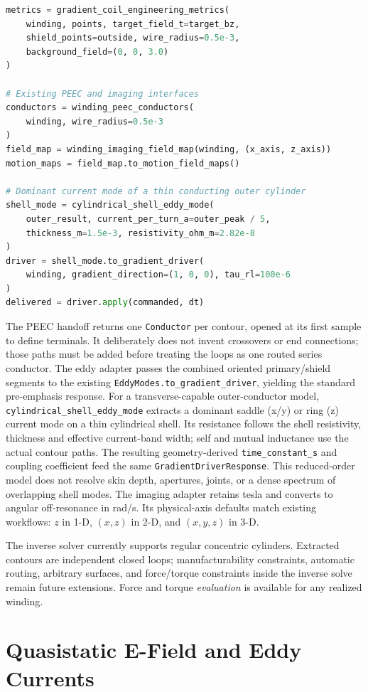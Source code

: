 \documentclass[11pt,oneside]{report}
\newcommand{\code}[1]{\texttt{#1}}
\begin{document}
\begin{lstlisting}[language=Python]
metrics = gradient_coil_engineering_metrics(
    winding, points, target_field_t=target_bz,
    shield_points=outside, wire_radius=0.5e-3,
    background_field=(0, 0, 3.0)
)

# Existing PEEC and imaging interfaces
conductors = winding_peec_conductors(
    winding, wire_radius=0.5e-3
)
field_map = winding_imaging_field_map(winding, (x_axis, z_axis))
motion_maps = field_map.to_motion_field_maps()

# Dominant current mode of a thin conducting outer cylinder
shell_mode = cylindrical_shell_eddy_mode(
    outer_result, current_per_turn_a=outer_peak / 5,
    thickness_m=1.5e-3, resistivity_ohm_m=2.82e-8
)
driver = shell_mode.to_gradient_driver(
    winding, gradient_direction=(1, 0, 0), tau_rl=100e-6
)
delivered = driver.apply(commanded, dt)
\end{lstlisting}

The PEEC handoff returns one \code{Conductor} per contour, opened at its first
sample to define terminals. It deliberately does not invent crossovers or end
connections; those paths must be added before treating the loops as one routed
series conductor. The eddy adapter passes the combined oriented primary/shield
segments to the existing \code{EddyModes.to\_gradient\_driver}, yielding the
standard pre-emphasis response. For a transverse-capable outer-conductor model,
\code{cylindrical\_shell\_eddy\_mode} extracts a dominant saddle (x/y) or ring
(z) current mode on a thin cylindrical shell. Its resistance follows the shell
resistivity, thickness and effective current-band width; self and mutual
inductance use the actual contour paths. The resulting geometry-derived
\code{time\_constant\_s} and coupling coefficient feed the same
\code{GradientDriverResponse}. This reduced-order model does not resolve skin
depth, apertures, joints, or a dense spectrum of overlapping shell modes.
The imaging adapter retains tesla and converts
to angular off-resonance in rad/s. Its physical-axis defaults match existing
workflows: $z$ in 1-D, $(x,z)$ in 2-D, and $(x,y,z)$ in 3-D.

The inverse solver currently supports regular concentric cylinders. Extracted
contours are independent closed loops; manufacturability constraints, automatic
routing, arbitrary surfaces, and force/torque constraints inside the inverse
solve remain future extensions. Force and torque \emph{evaluation} is available
for any realized winding.

\section{Quasistatic E-Field and Eddy Currents}
\label{sec:fields-quasistatic}
\end{document}
